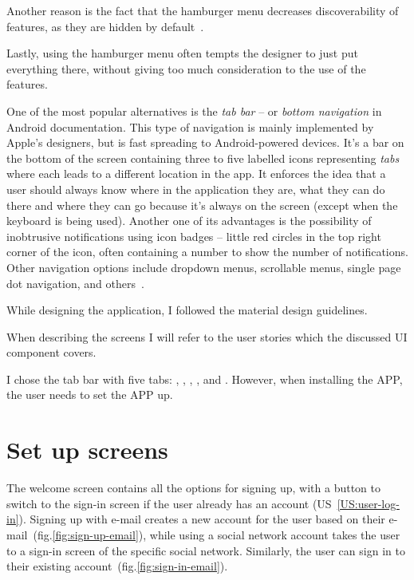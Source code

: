Another reason is the fact that the hamburger menu decreases discoverability of features, as they are hidden by default~\cite{hamburger-discoverabillity}.

Lastly, using the hamburger menu often tempts the designer to just put everything there, without giving too much consideration to the use of the features.

One of the most popular alternatives is the \textit{tab bar} -- or \textit{bottom navigation} in Android documentation.
This type of navigation is mainly implemented by Apple's designers, but is fast spreading to Android-powered devices.
It's a bar on the bottom of the screen containing three to five labelled icons representing \textit{tabs} where each leads to a different location in the app.
It enforces the idea that a user should always know where in the application they are, what they can do there and where they can go because it's always on the screen (except when the keyboard is being used).
Another one of its advantages is the possibility of inobtrusive notifications using icon badges -- little red circles in the top right corner of the icon, often containing a number to show the number of notifications.
Other navigation options include dropdown menus, scrollable menus, single page dot navigation, and others~\cite{hamburger-alternatives}.

While designing the application, I followed the material design guidelines.

When describing the screens I will refer to the user stories which the discussed UI component covers.

I chose the tab bar with five tabs: , , , , and .
However, when installing the APP, the user needs to set the APP up.

\section{Set up screens}
The welcome screen contains all the options for signing up, with a button to switch to the sign-in screen if the user already has an account (US~\ref{US:user-log-in}).
Signing up with e-mail creates a new account for the user based on their e-mail~(fig.\ref{fig:sign-up-email}), while using a social network account takes the user to a sign-in screen of the specific social network.
Similarly, the user can sign in to their existing account~(fig.\ref{fig:sign-in-email}).

